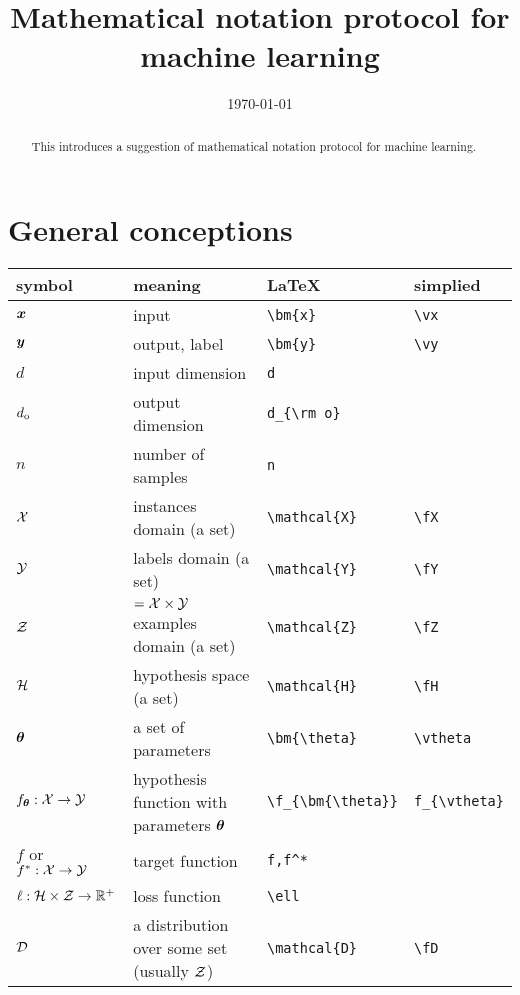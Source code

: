 \documentclass[]{report}
\begin{document}
\title{Mathematical notation protocol for machine learning}
\author{}
\date{\today}
\maketitle
\begin{abstract}
    This introduces a suggestion of mathematical notation protocol for machine learning.
\end{abstract}

\section{General conceptions}
\begin{center}
    \begin{tabular}{l|l|l|l}
        \hline
        symbol & meaning & \LaTeX & simplied\\
        \hline

        $\bm{x}$ & input & \verb!\bm{x}! & \verb!\vx! \\
        $\bm{y}$ & output, label & \verb!\bm{y}! & \verb!\vy! \\
        $d$ & input dimension & \verb!d! &  \\
        $d_{\rm o}$ & output dimension &\verb!d_{\rm o}! &  \\
        $n$ & number of samples & \verb!n!  \\
        $\mathcal{X}$
        & instances domain (a set)&\verb!\mathcal{X}!&\verb!\fX!\\
        $\mathcal{Y}$
        & labels domain (a set)&\verb!\mathcal{Y}!&\verb!\fY!\\
        $\mathcal{Z}$
        & $=\mathcal{X}\times\mathcal{Y}$ examples domain (a set)&\verb!\mathcal{Z}!&\verb!\fZ!\\
        $\mathcal{H}$
        & hypothesis space (a set)&\verb!\mathcal{H}!&\verb!\fH!\\
        $\bm{\theta}$ & a set of parameters & \verb!\bm{\theta}! &\verb!\vtheta!\\
        $f_{\bm{\theta}}:\mathcal{X}\to \mathcal{Y}$ & hypothesis function with parameters $\bm{\theta}$ & \verb!\f_{\bm{\theta}}! & \verb!f_{\vtheta}! \\
        $f$ or $f^*:\mathcal{X}\to\mathcal{Y}$ & target function  & \verb!f,f^*!   \\
        $\ell:\mathcal{H}\times \mathcal{Z}\to \mathbb{R}^+$ & loss function & \verb!\ell! \\
        $\mathcal{D}$
        & a distribution over some set (usually $\mathcal{Z}$)&\verb!\mathcal{D}!&\verb!\fD!\\


\end{tabular}
\end{center}
\end{document}
